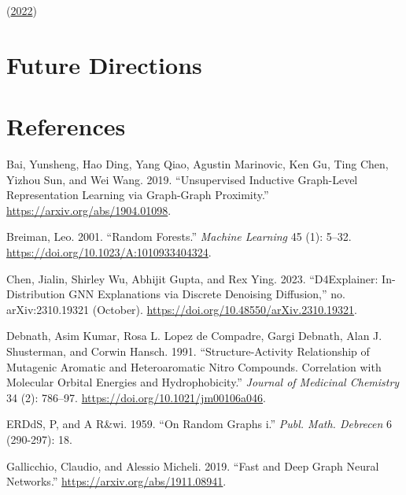 \documentclass[
  11pt,
  letterpaper,
]{article}
\newlength{\cslhangindent}
\newlength{\cslentryspacingunit} %
\newenvironment{CSLReferences}[2] %
 {%
  \setlength{\parindent}{0pt}
  \ifodd #1
  \let\oldpar\par
  \def\par{\hangindent=\cslhangindent\oldpar}
  \fi
  \setlength{\parskip}{#2\cslentryspacingunit}
 }%
 {}
\begin{document}
(\protect\hyperlink{ref-Huijben_Kool_Paulus_van_Sloun_2022}{2022})

\hypertarget{future-directions}{%
\section{Future Directions}\label{future-directions}}

\pagebreak

\hypertarget{references}{%
\section{References}\label{references}}

\hypertarget{refs}{}
\begin{CSLReferences}{1}{0}
\leavevmode{}%
Bai, Yunsheng, Hao Ding, Yang Qiao, Agustin Marinovic, Ken Gu, Ting
Chen, Yizhou Sun, and Wei Wang. 2019. {``Unsupervised Inductive
Graph-Level Representation Learning via Graph-Graph Proximity.''}
\url{https://arxiv.org/abs/1904.01098}.

\leavevmode{}%
Breiman, Leo. 2001. {``Random Forests.''} \emph{Machine Learning} 45
(1): 5--32. \url{https://doi.org/10.1023/A:1010933404324}.

\leavevmode{}%
Chen, Jialin, Shirley Wu, Abhijit Gupta, and Rex Ying. 2023.
{``D4Explainer: In-Distribution GNN Explanations via Discrete Denoising
Diffusion,''} no. arXiv:2310.19321 (October).
\url{https://doi.org/10.48550/arXiv.2310.19321}.

\leavevmode{}%
Debnath, Asim Kumar, Rosa L. Lopez de Compadre, Gargi Debnath, Alan J.
Shusterman, and Corwin Hansch. 1991. {``Structure-Activity Relationship
of Mutagenic Aromatic and Heteroaromatic Nitro Compounds. Correlation
with Molecular Orbital Energies and Hydrophobicity.''} \emph{Journal of
Medicinal Chemistry} 34 (2): 786--97.
\url{https://doi.org/10.1021/jm00106a046}.

\leavevmode{}%
ERDdS, P, and A R\&wi. 1959. {``On Random Graphs i.''} \emph{Publ. Math.
Debrecen} 6 (290-297): 18.

\leavevmode{}%
Gallicchio, Claudio, and Alessio Micheli. 2019. {``Fast and Deep Graph
Neural Networks.''} \url{https://arxiv.org/abs/1911.08941}.


\end{CSLReferences}
\end{document}
